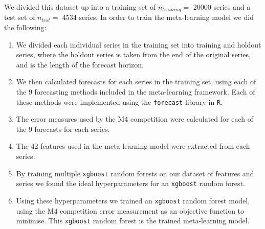 \documentclass[a4paper,12pt]{article}
\theoremstyle{definition}
\begin{document}
We divided this dataset up into a training set of $n_{training} = $ \num[group-separator={,}]{20000} series and a test set of $n_{test} = $ \num[group-separator={,}]{4534} series. In order to train the meta-learning model we did the following: 
\begin{enumerate}
	\item We divided each individual series in the training set into training and holdout series, where the holdout series is taken from the end of the original series, and is the length of the forecast horizon.
	\item We then calculated forecasts for each series in the training set, using each of the 9 forecasting methods included in the meta-learning framework. Each of these methods were implemented using the \texttt{forecast} library in \texttt{R}.
	\item The error measures used by the M4 competition were calculated for each of the 9 forecasts for each series.
	\item The 42 features used in the meta-learning model were extracted from each series.
	\item By training multiple \texttt{xgboost} random forests on our dataset of features and series we found the ideal hyperparameters for an \texttt{xgboost} random forest.
	\item Using these hyperparameters we trained an \texttt{xgboost} random forest model, using the M4 competition error measurement as an objective function to minimise. This \texttt{xgboost} random forest is the trained meta-learning model.
\end{enumerate}
\end{document}
